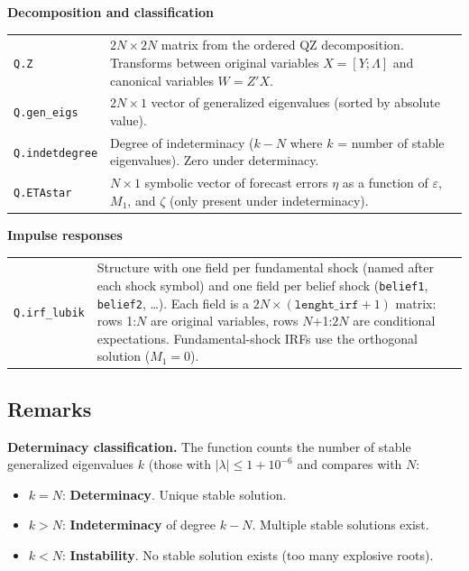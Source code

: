 \documentclass{article}
\begin{document}
\vspace{1em}
\noindent\textbf{Decomposition and classification}

\vspace{0.5em}
\begin{tabular}{@{}p{5cm}p{9cm}@{}}
\texttt{Q.Z} & $2N \times 2N$ matrix from the ordered QZ decomposition. Transforms between original variables $X = [Y; \Lambda]$ and canonical variables $W = Z' X$. \\[0.2em]
\texttt{Q.gen\_eigs} & $2N \times 1$ vector of generalized eigenvalues (sorted by absolute value). \\[0.2em]
\texttt{Q.indetdegree} & Degree of indeterminacy ($k - N$ where $k$ = number of stable eigenvalues). Zero under determinacy. \\[0.2em]
\texttt{Q.ETAstar} & $N \times 1$ symbolic vector of forecast errors $\eta$ as a function of $\varepsilon$, $M_1$, and $\zeta$ (only present under indeterminacy). \\[0.2em]
\end{tabular}

\vspace{1em}
\noindent\textbf{Impulse responses}

\vspace{0.5em}
\begin{tabular}{@{}p{5cm}p{9cm}@{}}
\texttt{Q.irf\_lubik} & Structure with one field per fundamental shock (named after each shock symbol) and one field per belief shock (\texttt{belief1}, \texttt{belief2}, \ldots). Each field is a $2N \times (\texttt{lenght\_irf}+1)$ matrix: rows 1:$N$ are original variables, rows $N$+1:$2N$ are conditional expectations. Fundamental-shock IRFs use the orthogonal solution ($M_1 = 0$). \\[0.2em]
\end{tabular}

\subsection{Remarks}

\noindent\textbf{Determinacy classification.} The function counts the number of stable generalized eigenvalues $k$ (those with $|\lambda| \leq 1 + 10^{-6}$ and compares with $N$:
\begin{itemize}[nosep]
\item $k = N$: \textbf{Determinacy}. Unique stable solution.
\item $k > N$: \textbf{Indeterminacy} of degree $k - N$. Multiple stable solutions exist.
\item $k < N$: \textbf{Instability}. No stable solution exists (too many explosive roots).
\end{itemize}
\end{document}
